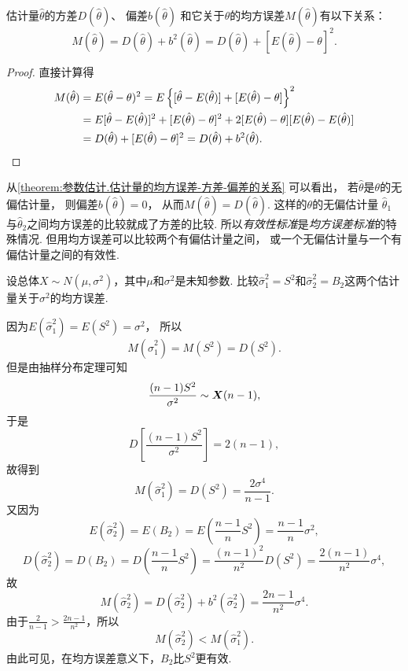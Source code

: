 \begin{theorem}\label{theorem:参数估计.估计量的均方误差-方差-偏差的关系}
估计量\(\hat{\theta}\)的方差\(D(\hat{\theta})\)、
偏差\(b(\hat{\theta})\)
和它关于\(\theta\)的均方误差\(M(\hat{\theta})\)有以下关系：
\begin{equation}
	M(\hat{\theta}) = D(\hat{\theta}) + b^2(\hat{\theta})
	= D(\hat{\theta}) + [E(\hat{\theta}) - \theta]^2.
\end{equation}
\begin{proof}
直接计算得\begin{align*}
	M(\hat{\theta})
	&= E(\hat{\theta} - \theta)^2
	= E\left\{
		[\hat{\theta} - E(\hat{\theta})]
		+ [E(\hat{\theta}) - \theta]
	\right\}^2 \\
	&= E[\hat{\theta} - E(\hat{\theta})]^2
	+ [E(\hat{\theta}) - \theta]^2
	+ 2[E(\hat{\theta}) - \theta][E(\hat{\theta}) - E(\hat{\theta})] \\
	&= D(\hat{\theta}) + [E(\hat{\theta}) - \theta]^2
	= D(\hat{\theta}) + b^2(\hat{\theta}).
	\qedhere
\end{align*}
\end{proof}
\end{theorem}
从\cref{theorem:参数估计.估计量的均方误差-方差-偏差的关系} 可以看出，
若\(\hat{\theta}\)是\(\theta\)的无偏估计量，
则偏差\(b(\hat{\theta})=0\)，
从而\(M(\hat{\theta})=D(\hat{\theta})\).
这样的\(\theta\)的无偏估计量
\(\hat{\theta}_1\)与\(\hat{\theta}_2\)之间均方误差的比较就成了方差的比较.
所以\emph{有效性标准}是\emph{均方误差标准}的特殊情况.
但用均方误差可以比较两个有偏估计量之间，
或一个无偏估计量与一个有偏估计量之间的有效性.

\begin{example}
设总体\(X \sim N(\mu,\sigma^2)\)，其中\(\mu\)和\(\sigma^2\)是未知参数.
比较\(\hat\sigma_1^2=S^2\)和\(\hat\sigma_2^2=B_2\)这两个估计量关于\(\sigma^2\)的均方误差.
\begin{solution}
因为\(E(\hat{\sigma}_1^2)
= E(S^2)
= \sigma^2\)，
所以\[
	M(\hat{\sigma}_1^2)
	= M(S^2)
	= D(S^2).
\]
但是由抽样分布定理可知\[
	\frac{(n-1) S^2}{\sigma^2}
	\sim
	\boldsymbol{X}(n-1),
\]
于是\[
	D\left[\frac{(n-1) S^2}{\sigma^2}\right]
	= 2(n-1),
\]
故得到\[
	M(\hat{\sigma}_1^2)
	= D(S^2)
	= \frac{2\sigma^4}{n-1}.
\]
又因为\[
	E(\hat{\sigma}_2^2)
	= E(B_2)
	= E\left(\frac{n-1}{n} S^2\right)
	= \frac{n-1}{n} \sigma^2,
\]\[
	D(\hat{\sigma}_2^2)
	= D(B_2)
	= D\left(\frac{n-1}{n} S^2\right)
	= \frac{(n-1)^2}{n^2} D(S^2)
	= \frac{2(n-1)}{n^2} \sigma^4,
\]
故\[
	M(\hat{\sigma}_2^2)
	= D(\hat{\sigma}_2^2) + b^2(\hat{\sigma}_2^2)
	= \frac{2n-1}{n^2} \sigma^4.
\]
由于\(\frac{2}{n-1} > \frac{2n-1}{n^2}\)，所以\[
	M(\hat{\sigma}_2^2) < M(\hat{\sigma}_1^2).
\]
由此可见，在均方误差意义下，\(B_2\)比\(S^2\)更有效.
\end{solution}
\end{example}

